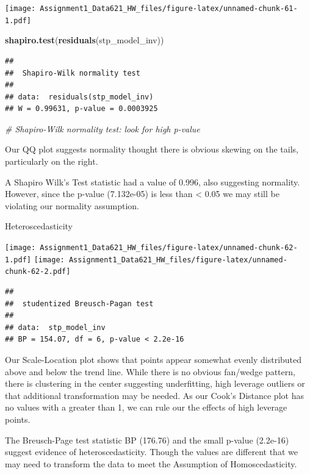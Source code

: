 \documentclass[
]{article}
\newenvironment{Shaded}{\begin{snugshade}}{\end{snugshade}}
\newcommand{\CommentTok}[1]{\textcolor[rgb]{0.56,0.35,0.01}{\textit{#1}}}
\newcommand{\FunctionTok}[1]{\textcolor[rgb]{0.13,0.29,0.53}{\textbf{#1}}}
\newcommand{\NormalTok}[1]{#1}
\begin{document}
\texttt{[image: Assignment1\_Data621\_HW\_files/figure-latex/unnamed-chunk-61-1.pdf]}

\begin{Shaded}
\begin{Highlighting}[]
\FunctionTok{shapiro.test}\NormalTok{(}\FunctionTok{residuals}\NormalTok{(stp\_model\_inv))}
\end{Highlighting}
\end{Shaded}

\begin{verbatim}
## 
##  Shapiro-Wilk normality test
## 
## data:  residuals(stp_model_inv)
## W = 0.99631, p-value = 0.0003925
\end{verbatim}

\begin{Shaded}
\begin{Highlighting}[]
\CommentTok{\# Shapiro{-}Wilk normality test: look for high p{-}value}
\end{Highlighting}
\end{Shaded}

Our QQ plot suggests normality thought there is obvious skewing on the
tails, particularly on the right.

A Shapiro Wilk's Test statistic had a value of 0.996, also suggesting
normality. However, since the p-value (7.132e-05) is less than
\textless{} 0.05 we may still be violating our normality assumption.

Heteroscedasticity

\texttt{[image: Assignment1\_Data621\_HW\_files/figure-latex/unnamed-chunk-62-1.pdf]}
\texttt{[image: Assignment1\_Data621\_HW\_files/figure-latex/unnamed-chunk-62-2.pdf]}

\begin{verbatim}
## 
##  studentized Breusch-Pagan test
## 
## data:  stp_model_inv
## BP = 154.07, df = 6, p-value < 2.2e-16
\end{verbatim}

Our Scale-Location plot shows that points appear somewhat evenly
distributed above and below the trend line. While there is no obvious
fan/wedge pattern, there is clustering in the center suggesting
underfitting, high leverage outliers or that additional transformation
may be needed. As our Cook's Distance plot has no values with a greater
than 1, we can rule our the effects of high leverage points.

The Breusch-Page test statistic BP (176.76) and the small p-value
(2.2e-16) suggest evidence of heteroscedasticity. Though the values are
different that we may need to transform the data to meet the Assumption
of Homoscedasticity.
\end{document}
